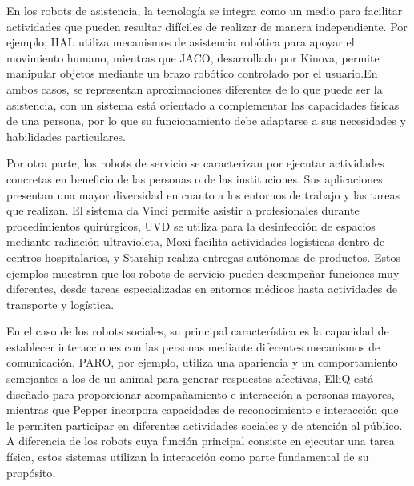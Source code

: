 \documentclass[11pt,a4paper]{article}
\begin{document}
En los robots de asistencia, la tecnología se integra como un medio para facilitar actividades que pueden resultar difíciles de realizar de manera independiente. Por ejemplo, HAL utiliza mecanismos de asistencia robótica para apoyar el movimiento humano, mientras que JACO, desarrollado por Kinova, permite manipular objetos mediante un brazo robótico controlado por el usuario.En ambos casos, se representan aproximaciones diferentes de lo que puede ser la asistencia, con un sistema está orientado a complementar las capacidades físicas de una persona, por lo que su funcionamiento debe adaptarse a sus necesidades y habilidades particulares. \cite{jaco, hal} 

Por otra parte, los robots de servicio se caracterizan por ejecutar actividades concretas en beneficio de las personas o de las instituciones. Sus aplicaciones presentan una mayor diversidad en cuanto a los entornos de trabajo y las tareas que realizan. El sistema da Vinci permite asistir a profesionales durante procedimientos quirúrgicos, UVD se utiliza para la desinfección de espacios mediante radiación ultravioleta, Moxi facilita actividades logísticas dentro de centros hospitalarios, y Starship realiza entregas autónomas de productos. Estos ejemplos muestran que los robots de servicio pueden desempeñar funciones muy diferentes, desde tareas especializadas en entornos médicos hasta actividades de transporte y logística.

En el caso de los robots sociales, su principal característica es la capacidad de establecer interacciones con las personas mediante diferentes mecanismos de comunicación. PARO, por ejemplo, utiliza una apariencia y un comportamiento semejantes a los de un animal para generar respuestas afectivas, ElliQ está diseñado para proporcionar acompañamiento e interacción a personas mayores, mientras que Pepper incorpora capacidades de reconocimiento e interacción que le permiten participar en diferentes actividades sociales y de atención al público.\cite{aist, elliq, pepper}  A diferencia de los robots cuya función principal consiste en ejecutar una tarea física, estos sistemas utilizan la interacción como parte fundamental de su propósito.
\end{document}
